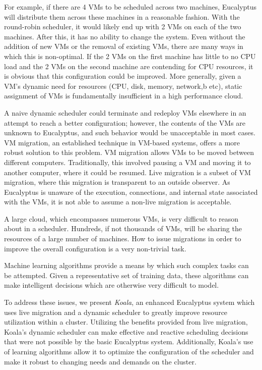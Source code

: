 For example, if there are 4 VMs to be scheduled across two machines, Eucalyptus will distribute them across these machines in a reasonable fashion.  With the round-robin scheduler, it would likely end up with 2 VMs on each of the two machines.  After this, it has no ability to change the system.  Even without the addition of new VMs or the removal of existing VMs, there are many ways in which this is non-optimal.  If the 2 VMs on the first machine has little to no CPU load and the 2 VMs on the second machine are contending for CPU resources, it is obvious that this configuration could be improved.  More generally, given a VM's dynamic need for resources (CPU, disk, memory, network,b etc), static assignment of VMs is fundamentally insufficient in a high performance cloud.

A naive dynamic scheduler could terminate and redeploy VMs elsewhere in an attempt to reach a better configuration;  however, the contents of the VMs are unknown to Eucalyptus, and such behavior would be unacceptable in most cases.  VM migration, an established technique in VM-based systems, offers a more robust solution to this problem.  VM migration allows VMs to be moved between different computers.  Traditionally, this involved pausing a VM and moving it to another computer, where it could be resumed.  Live migration is a subset of VM migration, where this migration is transparent to an outside observer.  As Eucalyptus is unaware of the execution, connections, and internal state associated with the VMs, it is not able to assume a non-live migration is acceptable.  

A large cloud, which encompasses numerous VMs, is very difficult to reason about in a scheduler.  Hundreds, if not thousands of VMs, will be sharing the resources of a large number of machines.  How to issue migrations in order to improve the overall configuration is a very non-trivial task.  

Machine learning algorithms provide a means by which such complex tasks can be attempted.  Given a representative set of training data, these algorithms can make intelligent decisions which are otherwise very difficult to model.

To address these issues, we present \emph{Koala}, an enhanced Eucalyptus system which uses live migration and a dynamic scheduler to greatly improve resource utilization within a cluster.  Utilizing the benefits provided from live migration, Koala's dynamic scheduler can make effective and reactive scheduling decisions that were not possible by the basic Eucalyptus system.  Additionally, Koala's use of learning algorithms allow it to optimize the configuration of the scheduler and make it robust to changing needs and demands on the cluster.


